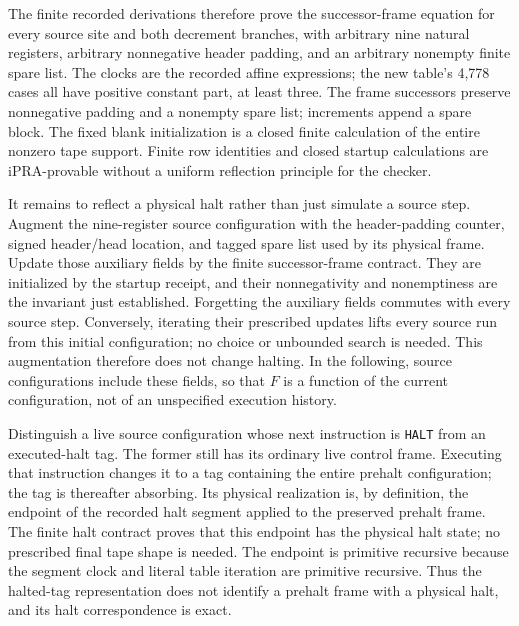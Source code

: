 The finite recorded derivations therefore prove the successor-frame
equation for every source site and both decrement branches, with
arbitrary nine natural registers, arbitrary nonnegative header
padding, and an arbitrary nonempty finite spare list.  The clocks
are the recorded affine expressions; the new table's 4,778 cases
all have positive constant part, at least three.  The frame
successors preserve nonnegative padding and a nonempty spare list;
increments append a spare block.  The fixed blank initialization
is a closed finite calculation of the entire nonzero tape support.
Finite row identities and closed startup calculations are
iPRA-provable without a uniform reflection principle for the checker.

It remains to reflect a physical halt rather than just simulate a
source step.  Augment the nine-register source configuration with
the header-padding counter, signed header/head location, and tagged
spare list used by its physical frame.  Update those auxiliary
fields by the finite
successor-frame contract.  They are initialized by the startup
receipt, and their nonnegativity and nonemptiness are the invariant
just established.  Forgetting the auxiliary fields commutes with
every source step.  Conversely, iterating their prescribed updates
lifts every source run from this initial configuration; no choice
or unbounded search is needed.  This augmentation therefore does
not change halting.  In the following, source configurations include
these fields, so that $F$ is a function of the current configuration,
not of an unspecified execution history.

Distinguish a live source configuration whose next
instruction is \texttt{HALT} from an executed-halt tag.  The former
still has its ordinary live control frame.  Executing that instruction
changes it to a tag containing the entire prehalt configuration;
the tag is thereafter absorbing.  Its physical realization is,
by definition, the endpoint of the recorded halt segment applied to
the preserved prehalt frame.  The finite halt contract proves that
this endpoint has the physical halt state; no prescribed final tape
shape is needed.  The endpoint is primitive recursive because the
segment clock and literal table iteration are primitive recursive.
Thus the halted-tag representation does not identify a prehalt
frame with a physical halt, and its halt correspondence is exact.


